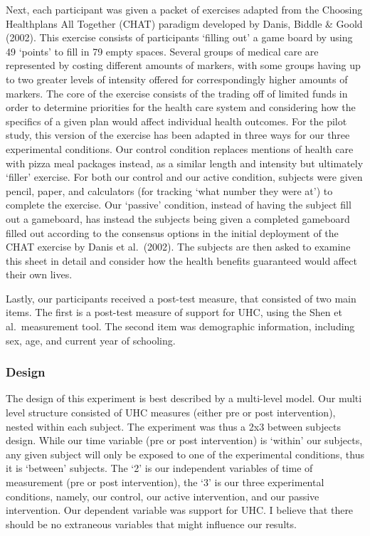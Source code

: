 \documentclass[
]{article}
\begin{document}
Next, each participant was given a packet of exercises adapted from the
Choosing Healthplans All Together (CHAT) paradigm developed by Danis,
Biddle \& Goold (2002). This exercise consists of participants `filling
out' a game board by using 49 `points' to fill in 79 empty spaces.
Several groups of medical care are represented by costing different
amounts of markers, with some groups having up to two greater levels of
intensity offered for correspondingly higher amounts of markers. The
core of the exercise consists of the trading off of limited funds in
order to determine priorities for the health care system and considering
how the specifics of a given plan would affect individual health
outcomes. For the pilot study, this version of the exercise has been
adapted in three ways for our three experimental conditions. Our control
condition replaces mentions of health care with pizza meal packages
instead, as a similar length and intensity but ultimately `filler'
exercise. For both our control and our active condition, subjects were
given pencil, paper, and calculators (for tracking `what number they
were at') to complete the exercise. Our `passive' condition, instead of
having the subject fill out a gameboard, has instead the subjects being
given a completed gameboard filled out according to the consensus
options in the initial deployment of the CHAT exercise by Danis et
al.~(2002). The subjects are then asked to examine this sheet in detail
and consider how the health benefits guaranteed would affect their own
lives.

Lastly, our participants received a post-test measure, that consisted of
two main items. The first is a post-test measure of support for UHC,
using the Shen et al.~measurement tool. The second item was demographic
information, including sex, age, and current year of schooling.

\hypertarget{design}{%
\subsubsection{Design}\label{design}}

The design of this experiment is best described by a multi-level model.
Our multi level structure consisted of UHC measures (either pre or post
intervention), nested within each subject. The experiment was thus a 2x3
between subjects design. While our time variable (pre or post
intervention) is `within' our subjects, any given subject will only be
exposed to one of the experimental conditions, thus it is `between'
subjects. The `2' is our independent variables of time of measurement
(pre or post intervention), the `3' is our three experimental
conditions, namely, our control, our active intervention, and our
passive intervention. Our dependent variable was support for UHC. I
believe that there should be no extraneous variables that might
influence our results.
\end{document}

